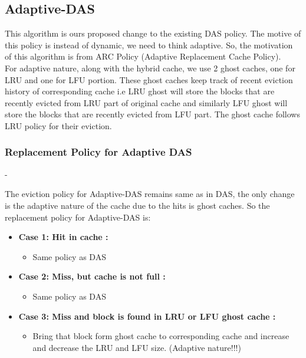 \documentclass[conference]{IEEEtran}
\begin{document}
\subsection{\textbf{Adaptive-DAS}}

This algorithm is ours proposed change to the existing DAS policy. The motive of this policy is instead of dynamic, we need to think adaptive. So, the motivation of this algorithm is from ARC Policy (Adaptive Replacement Cache Policy).\\

For adaptive nature, along with the hybrid cache, we use 2 ghost caches, one for LRU and one for LFU portion. These ghost caches keep track of recent eviction history of corresponding cache i.e LRU ghost will store the blocks that are recently evicted from LRU part of original cache and similarly LFU ghost will store the blocks that are recently evicted from LFU part. The ghost cache follows LRU policy for their eviction.\\

\subsubsection*{\textbf{Replacement Policy for Adaptive DAS}}-

The eviction policy for Adaptive-DAS remains same as in DAS, the only change is the adaptive nature of the cache due to the hits is ghost caches. So the replacement policy for Adaptive-DAS is:

\begin{itemize}
    \item \textbf{ Case 1: Hit in cache :}
    \begin{itemize}
        \item Same policy as DAS
    \end{itemize}
    
    \item \textbf{ Case 2: Miss, but cache is not full  :}
    \begin{itemize}
        \item Same policy as DAS
    \end{itemize}
    
    \item \textbf{ Case 3: Miss and block is found in LRU or LFU ghost cache :}
    \begin{itemize}
        \item Bring that block form ghost cache to corresponding cache and increase and decrease the LRU and LFU size. (Adaptive nature!!!)
    \end{itemize}
\end{itemize}
\end{document}
